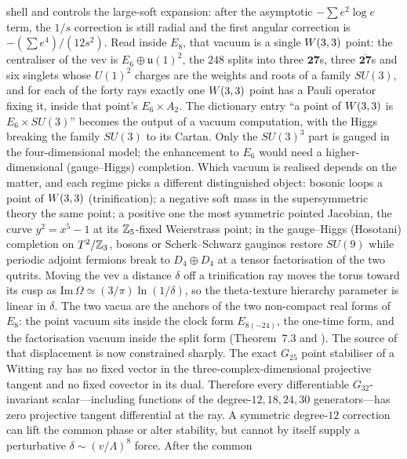 shell and controls the large-soft expansion: after the asymptotic $-\sum e^2\log e$ term, the $1/s$ correction is
still radial and the first angular correction is $-(\sum e^4)/(12s^2)$.
Read inside $E_8$, that vacuum is a single $W(3,3)$ point: the centraliser of the vev is $E_6\oplus\mathfrak u(1)^2$, the
$248$ splits into three $\mathbf{27}$s, three $\overline{\mathbf{27}}$s and six singlets whose $U(1)^2$ charges are the
weights and roots of a family $SU(3)$, and for each of the forty rays exactly one $W(3,3)$ point has a Pauli operator fixing
it, inside that point's $E_6\times A_2$. The dictionary entry ``a point of $W(3,3)$ is $E_6\times SU(3)$'' becomes the
output of a vacuum computation, with the Higgs breaking the family $SU(3)$ to its Cartan. Only the $SU(3)^3$ part is
gauged in the four-dimensional model; the enhancement to $E_6$ would need a higher-dimensional (gauge--Higgs) completion.
Which vacuum is realised depends on the matter, and each regime picks a different distinguished object: bosonic loops a
point of $W(3,3)$ (trinification); a negative soft mass in the supersymmetric theory the same point; a positive one the most
symmetric pointed Jacobian, the curve $y^2=x^5-1$ at its $\mathbb{Z}_5$-fixed Weierstrass point; in the gauge--Higgs (Hosotani)
completion on $T^2/\mathbb{Z}_3$, bosons or Scherk--Schwarz gauginos restore $SU(9)$ while periodic adjoint fermions break to
$D_4\oplus D_4$ at a tensor factorisation of the two qutrits. Moving the vev a distance $\delta$ off a trinification ray
moves the torus toward its cusp as $\mathrm{Im}\,\Omega\simeq(3/\pi)\ln(1/\delta)$, so the theta-texture hierarchy
parameter is linear in $\delta$.  The two vacua are the anchors of the two non-compact real forms of $E_8$: the point vacuum sits inside the clock form $E_{8(-24)}$, the one-time form, and the factorisation vacuum inside the split form (Theorem~7.3 and ).
The source of that displacement is now constrained sharply.  The exact $G_{25}$ point stabiliser of a Witting ray has
no fixed vector in the three-complex-dimensional projective tangent and no fixed covector in its dual.  Therefore every
differentiable $G_{32}$-invariant scalar---including functions of the degree-$12,18,24,30$ generators---has zero
projective tangent differential at the ray.  A symmetric degree-$12$ correction can lift the common phase or alter
stability, but cannot by itself supply a perturbative $\delta\sim(v/\Lambda)^8$ force.  After the common
